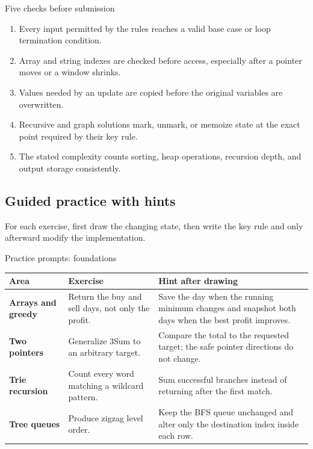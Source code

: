 \begin{revisionbox}{Five checks before submission}
\begin{enumerate}
  \item Every input permitted by the rules reaches a valid base case or
  loop termination condition.
  \item Array and string indexes are checked before access, especially after a
  pointer moves or a window shrinks.
  \item Values needed by an update are copied before the original variables are
  overwritten.
  \item Recursive and graph solutions mark, unmark, or memoize state at the
  exact point required by their key rule.
  \item The stated complexity counts sorting, heap operations, recursion depth,
  and output storage consistently.
\end{enumerate}
\end{revisionbox}

\subsection{Guided practice with hints}

For each exercise, first draw the changing state, then write the key rule and
only afterward modify the implementation.

\begin{revisionbox}{Practice prompts: foundations}
\renewcommand{\arraystretch}{1.12}
\begin{tabularx}{\linewidth}{@{}>{\raggedright\arraybackslash\bfseries}p{2.45cm}
  >{\raggedright\arraybackslash}X
  >{\raggedright\arraybackslash}X@{}}
\toprule
Area & Exercise & Hint after drawing \\
\midrule
Arrays and greedy & Return the buy and sell days, not only the profit. & Save
the day when the running minimum changes and snapshot both days when the best
profit improves. \\
Two pointers & Generalize 3Sum to an arbitrary target. & Compare the total to
the requested target; the safe pointer directions do not change. \\
Trie recursion & Count every word matching a wildcard pattern. & Sum successful
branches instead of returning after the first match. \\
Tree queues & Produce zigzag level order. & Keep the BFS queue unchanged and
alter only the destination index inside each row. \\
\bottomrule
\end{tabularx}
\end{revisionbox}

